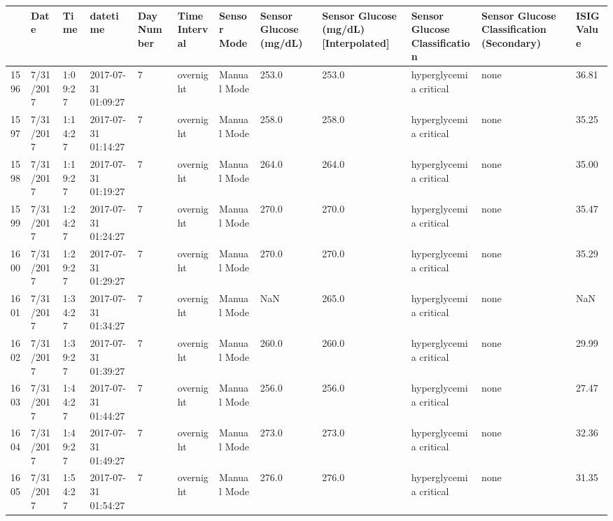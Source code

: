 \bigskip\noindent
\begin{tabular}{p{}p{}p{}p{}p{}p{}p{}p{}p{}p{}p{}p{}}
\toprule
 & Date & Time & datetime & Day Number & Time Interval & Sensor Mode & Sensor Glucose (mg/dL) & Sensor Glucose (mg/dL) [Interpolated] & Sensor Glucose Classification & Sensor Glucose Classification (Secondary) & ISIG Value \\
\hline
1596 & 7/31/2017 & 1:09:27 & 2017-07-31 01:09:27 & 7 & overnight & Manual Mode & 253.0 & 253.0 & hyperglycemia critical & none & 36.81 \\
\hline
1597 & 7/31/2017 & 1:14:27 & 2017-07-31 01:14:27 & 7 & overnight & Manual Mode & 258.0 & 258.0 & hyperglycemia critical & none & 35.25 \\
\hline
1598 & 7/31/2017 & 1:19:27 & 2017-07-31 01:19:27 & 7 & overnight & Manual Mode & 264.0 & 264.0 & hyperglycemia critical & none & 35.00 \\
\hline
1599 & 7/31/2017 & 1:24:27 & 2017-07-31 01:24:27 & 7 & overnight & Manual Mode & 270.0 & 270.0 & hyperglycemia critical & none & 35.47 \\
\hline
1600 & 7/31/2017 & 1:29:27 & 2017-07-31 01:29:27 & 7 & overnight & Manual Mode & 270.0 & 270.0 & hyperglycemia critical & none & 35.29 \\
\hline
1601 & 7/31/2017 & 1:34:27 & 2017-07-31 01:34:27 & 7 & overnight & Manual Mode & NaN & 265.0 & hyperglycemia critical & none & NaN \\
\hline
1602 & 7/31/2017 & 1:39:27 & 2017-07-31 01:39:27 & 7 & overnight & Manual Mode & 260.0 & 260.0 & hyperglycemia critical & none & 29.99 \\
\hline
1603 & 7/31/2017 & 1:44:27 & 2017-07-31 01:44:27 & 7 & overnight & Manual Mode & 256.0 & 256.0 & hyperglycemia critical & none & 27.47 \\
\hline
1604 & 7/31/2017 & 1:49:27 & 2017-07-31 01:49:27 & 7 & overnight & Manual Mode & 273.0 & 273.0 & hyperglycemia critical & none & 32.36 \\
\hline
1605 & 7/31/2017 & 1:54:27 & 2017-07-31 01:54:27 & 7 & overnight & Manual Mode & 276.0 & 276.0 & hyperglycemia critical & none & 31.35 \\

\end{tabular}
